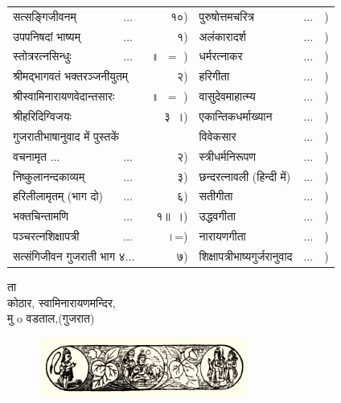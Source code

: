 \documentclass[10pt, openany]{book}
\begin{document}
{\begin{table}[h!]
\begin{tabular}{llr|llr}
सत्सङ्गिजीवनम् &$\ldots$ &१०)& पुरुषोत्तमचरित्र& $\ldots$& )\\
उपपनिषदां भाष्यम्& $\ldots$& १)& अलंकारादर्श& $\ldots$& )\\
स्तोत्ररत्नसिन्धुः& $\ldots$ &~॥~$=$ ) &धर्मरत्नाकर &$\ldots$& )\\
\multicolumn{2}{l}{श्रीमद्भागवतं भक्तरञ्जनीयुतम्} &२) &हरिगीता &$\ldots$& )\\
\multicolumn{2}{l}{श्रीस्वामिनारायणवेदान्तसारः} &~॥~$=$ )& वासुदेवमाहात्म्य &$\ldots$ &)\\
श्रीहरिदिग्विजयः &&३~।)& एकान्तिकधर्माख्यान &$\ldots$& )\\
\multicolumn{3}{l|}{\;\;\; गुजरातीभाषानुवाद में पुस्तकें }& विवेकसार& $\ldots$& )\\
वचनामृत \;\;\;\; $\ldots$ &$\ldots$& २) &स्त्रीधर्मनिरूपण& $\ldots$& )\\
निष्कुलानन्दकाव्यम् &$\ldots$ &३)& छन्दरत्नावली (हिन्दी में) &$\ldots$& )\\
हरिलीलामृतम् (भाग दो)& $\ldots$ &६)& सतीगीता &$\ldots$& )\\
भक्तचिन्तामणि& $\ldots$ &१॥~।) &उद्धवगीता& $\ldots$& )\\
पञ्चरत्नशिक्षापत्री& $\ldots$ &~।=)& नारायणगीता &$\ldots$& )\\
\multicolumn{2}{l}{सत्संगिजीवन गुजराती भाग ४$\ldots$}&७)& शिक्षापत्रीभाष्यगुर्जरानुवाद&$\ldots$& )\\
\hline
    \end{tabular}
\end{table}
\begin{flushright}
ता\textemdash \;\;\;\;\;\;\;\;\;\;\;\;\;\;\;\;\;\;\;\;\;\;\;\;\;\;\;\;\;\;\;\;\\
{\large कोठार, स्वामिनारायणमन्दिर,}\\
 मु o वडताल,(गुजरात)
\end{flushright}
\begin{figure}[h!]
    \centering
    \includegraphics{graphics/Capture2.PNG}
\end{figure}
\newpage
\vspace*{\fill}
\begin{minipage}{.3\textwidth}
    \hfill
\end{minipage}\hfill
\begin{minipage}{.7\textwidth}

\end{minipage}}
\end{document}
